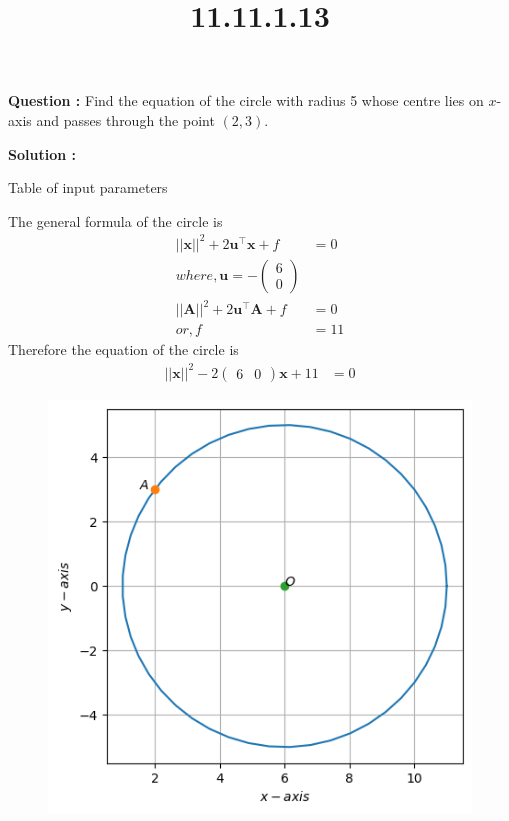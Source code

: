 \documentclass[12pt]{article}
\let\vec\mathbf
\providecommand{\brak}[1]{\ensuremath{\left(#1\right)}}
\providecommand{\myvec}[1]{\ensuremath{\begin{pmatrix}#1\end{pmatrix}}}
\providecommand{\norm}[1]{\ensuremath{\lvert|#1\rvert|}}
\begin{document}
\title{\textbf{11.11.1.13}}
\date{}
\maketitle
\textbf{Question :} Find the equation of the circle with radius 5 whose centre lies on $x$-axis and passes through the point $\brak{2,3}$.

\textbf{Solution :}
\begin{table}[H]
    \centering
    
    \caption{Table of input parameters}
    \label{tab:11.11.1.13}
\end{table}
The general formula of the circle is
\begin{align}
\norm{\vec{x}}^2 + 2\vec{u}^{\top}\vec{x}+f&=0\\
 where,   \vec{u}=-\myvec{6\\0}\\
 \norm{\vec{A}}^2 + 2\vec{u}^{\top}\vec{A}+f&=0\\
 or,f&=11
\end{align}
Therefore the equation of the circle is
\begin{align}
   \norm{\vec{x}}^2 - 2\myvec{6&0}\vec{x}+11&=0
\end{align}    
\begin{figure}[H]
    \centering
	\includegraphics[width=\columnwidth]{fig/11.11.1.13.png}
    \caption{}
    \label{fig:11.11.1.13}
\end{figure}
\end{document}
